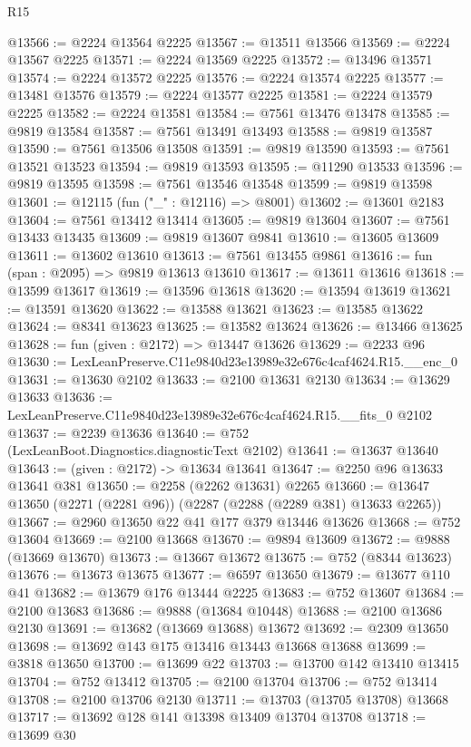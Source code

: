 \begin{lexlean}{R15}
\begin{coremodule}
@13566 := @2224 @13564 @2225
@13567 := @13511 @13566
@13569 := @2224 @13567 @2225
@13571 := @2224 @13569 @2225
@13572 := @13496 @13571
@13574 := @2224 @13572 @2225
@13576 := @2224 @13574 @2225
@13577 := @13481 @13576
@13579 := @2224 @13577 @2225
@13581 := @2224 @13579 @2225
@13582 := @2224 @13581
@13584 := @7561 @13476 @13478
@13585 := @9819 @13584
@13587 := @7561 @13491 @13493
@13588 := @9819 @13587
@13590 := @7561 @13506 @13508
@13591 := @9819 @13590
@13593 := @7561 @13521 @13523
@13594 := @9819 @13593
@13595 := @11290 @13533
@13596 := @9819 @13595
@13598 := @7561 @13546 @13548
@13599 := @9819 @13598
@13601 := @12115 (fun ("_" : @12116) => @8001)
@13602 := @13601 @2183
@13604 := @7561 @13412 @13414
@13605 := @9819 @13604
@13607 := @7561 @13433 @13435
@13609 := @9819 @13607 @9841
@13610 := @13605 @13609
@13611 := @13602 @13610
@13613 := @7561 @13455 @9861
@13616 := fun (span : @2095) => @9819 @13613 @13610
@13617 := @13611 @13616
@13618 := @13599 @13617
@13619 := @13596 @13618
@13620 := @13594 @13619
@13621 := @13591 @13620
@13622 := @13588 @13621
@13623 := @13585 @13622
@13624 := @8341 @13623
@13625 := @13582 @13624
@13626 := @13466 @13625
@13628 := fun (given : @2172) => @13447 @13626
@13629 := @2233 @96
@13630 := LexLeanPreserve.C11e9840d23e13989e32e676c4caf4624.R15.__enc_0
@13631 := @13630 @2102
@13633 := @2100 @13631 @2130
@13634 := @13629 @13633
@13636 := LexLeanPreserve.C11e9840d23e13989e32e676c4caf4624.R15.__fits_0 @2102
@13637 := @2239 @13636
@13640 := @752 (LexLeanBoot.Diagnostics.diagnosticText @2102)
@13641 := @13637 @13640
@13643 := (given : @2172) -> @13634 @13641
@13647 := @2250 @96 @13633 @13641 @381
@13650 := @2258 (@2262 @13631) @2265
@13660 := @13647 @13650 (@2271 (@2281 @96)) (@2287 (@2288 (@2289 @381) @13633 @2265))
@13667 := @2960 @13650 @22 @41 @177 @379 @13446 @13626
@13668 := @752 @13604
@13669 := @2100 @13668
@13670 := @9894 @13609
@13672 := @9888 (@13669 @13670)
@13673 := @13667 @13672
@13675 := @752 (@8344 @13623)
@13676 := @13673 @13675
@13677 := @6597 @13650
@13679 := @13677 @110 @41
@13682 := @13679 @176 @13444 @2225
@13683 := @752 @13607
@13684 := @2100 @13683
@13686 := @9888 (@13684 @10448)
@13688 := @2100 @13686 @2130
@13691 := @13682 (@13669 @13688) @13672
@13692 := @2309 @13650
@13698 := @13692 @143 @175 @13416 @13443 @13668 @13688
@13699 := @3818 @13650
@13700 := @13699 @22
@13703 := @13700 @142 @13410 @13415
@13704 := @752 @13412
@13705 := @2100 @13704
@13706 := @752 @13414
@13708 := @2100 @13706 @2130
@13711 := @13703 (@13705 @13708) @13668
@13717 := @13692 @128 @141 @13398 @13409 @13704 @13708
@13718 := @13699 @30

\end{coremodule}
\end{lexlean}
